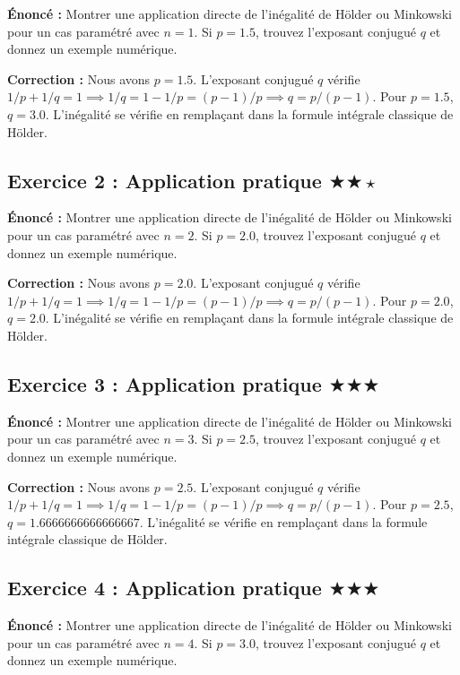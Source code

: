 \documentclass[11pt,a4paper]{article}
\begin{document}
\textbf{Énoncé :}
Montrer une application directe de l'inégalité de Hölder ou Minkowski pour un cas paramétré avec $n=1$.
Si $p=1.5$, trouvez l'exposant conjugué $q$ et donnez un exemple numérique.

\textbf{Correction :}
Nous avons $p = 1.5$.
L'exposant conjugué $q$ vérifie $1/p + 1/q = 1 \implies 1/q = 1 - 1/p = (p-1)/p \implies q = p/(p-1)$.
Pour $p = 1.5$, $q = 3.0$.
L'inégalité se vérifie en remplaçant dans la formule intégrale classique de Hölder.


\subsection*{Exercice 2 : Application pratique $\bigstar\bigstar\star$}

\textbf{Énoncé :}
Montrer une application directe de l'inégalité de Hölder ou Minkowski pour un cas paramétré avec $n=2$.
Si $p=2.0$, trouvez l'exposant conjugué $q$ et donnez un exemple numérique.

\textbf{Correction :}
Nous avons $p = 2.0$.
L'exposant conjugué $q$ vérifie $1/p + 1/q = 1 \implies 1/q = 1 - 1/p = (p-1)/p \implies q = p/(p-1)$.
Pour $p = 2.0$, $q = 2.0$.
L'inégalité se vérifie en remplaçant dans la formule intégrale classique de Hölder.


\subsection*{Exercice 3 : Application pratique $\bigstar\bigstar\bigstar$}

\textbf{Énoncé :}
Montrer une application directe de l'inégalité de Hölder ou Minkowski pour un cas paramétré avec $n=3$.
Si $p=2.5$, trouvez l'exposant conjugué $q$ et donnez un exemple numérique.

\textbf{Correction :}
Nous avons $p = 2.5$.
L'exposant conjugué $q$ vérifie $1/p + 1/q = 1 \implies 1/q = 1 - 1/p = (p-1)/p \implies q = p/(p-1)$.
Pour $p = 2.5$, $q = 1.6666666666666667$.
L'inégalité se vérifie en remplaçant dans la formule intégrale classique de Hölder.


\subsection*{Exercice 4 : Application pratique $\bigstar\bigstar\bigstar$}

\textbf{Énoncé :}
Montrer une application directe de l'inégalité de Hölder ou Minkowski pour un cas paramétré avec $n=4$.
Si $p=3.0$, trouvez l'exposant conjugué $q$ et donnez un exemple numérique.
\end{document}
